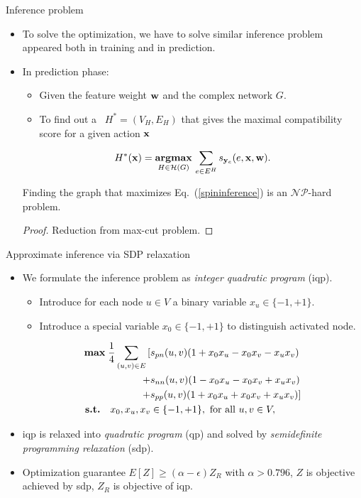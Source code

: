 \documentclass[first=dgreen,second=purple,logo=yellowexc]{aaltoslides}
\begin{document}
\begin{frame}{Inference problem}
	\begin{itemize}
		\item To solve the optimization, we have to solve similar inference problem appeared both in training and in prediction.
		\item In prediction phase:
		\begin{itemize}\footnotesize
			\item Given the feature weight $\mathbf {w}$ and the complex network $G$.
			\item To find out a \daggraph\ $H^*=(V_H,E_H)$ that gives the maximal compatibility score for a given action $\mathbf {x}$
		\end{itemize}
	\begin{align}
		H^*(\mathbf {x}) = \underset{H\in \mathcal{H}(G)}{\textbf{argmax}}\, \sum_{e\in E^H}s_{\mathbf {y}_e}(e,\mathbf {x},\mathbf {w}).\label{spininference}
	\end{align}
	\begin{lemma}\footnotesize
		Finding the graph that maximizes Eq.~(\ref{spininference}) is an $\mathcal{NP}$-hard problem.
	\end{lemma}
	\begin{proof}\footnotesize
		Reduction from {\sc max-cut} problem.
	\end{proof}
	\end{itemize}
\end{frame}

\begin{frame}[allowframebreaks]{Approximate inference via {\sc SDP} relaxation}
	\begin{itemize}\footnotesize
		\item We formulate the inference problem as {\it integer quadratic program} ({\sc iqp}).
		\begin{itemize}\footnotesize
			\item Introduce for each node $u\in V$ a binary variable $x_u\in\{-1,+1\}$.
			\item Introduce a special variable $x_0\in\{-1,+1\}$ to distinguish activated node.
		\end{itemize}
		{\scriptsize
		\begin{align*}
		\textbf{max} \; \frac{1}{4} \sum_{(u, v)\in E}\, [ & s_{\sc pn}(u,v) (1 + x_0 x_u - x_0 x_v - x_u x_v)  \\ 
			+ & s_{\sc nn}(u,v) (1 - x_0 x_u - x_0 x_v + x_u x_v)  \\ 
			+ & s_{\sc pp}(u,v) (1 + x_0 x_u + x_0 x_v + x_u x_v) ] \\
		\textbf{s.t.} \quad  x_0, x_u, x_v &\in \{-1,+1\}, \text{ for all } u,v\in V,
		\end{align*}}
		\item {\sc iqp} is relaxed into {\em quadratic program} ({\sc qp}) and solved by {\it semidefinite programming relaxation} ({\sc sdp}).
		\item Optimization guarantee $E[Z] \ge (\alpha-\epsilon) Z_{R} $ with $\alpha>0.796$, $Z$ is objective achieved by {\sc sdp}, $Z_R$ is objective of {\sc iqp}.
	\end{itemize}
\end{frame}
\end{document}
